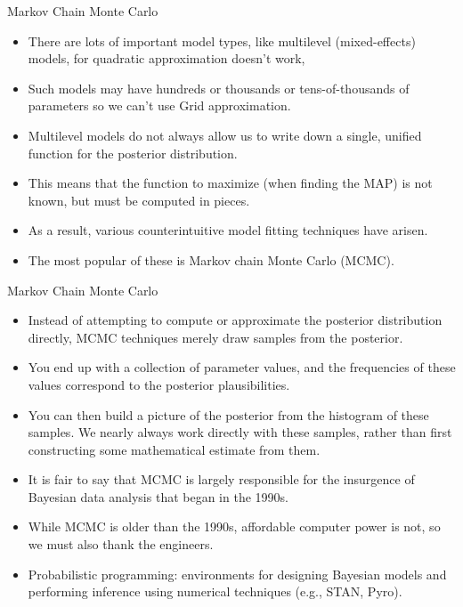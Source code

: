 \documentclass[handout]{beamer}
\begin{document}
\begin{frame}{Markov Chain Monte Carlo}
\scriptsize{

\begin{itemize}
\item There are lots of important model types, like multilevel (mixed-effects) models, for  quadratic approximation doesn't work,
\item Such models may have hundreds or thousands or tens-of-thousands of parameters so we can't use Grid approximation.
\item Multilevel models do not always allow us to write down a single, unified function for the posterior distribution.
\item This means that the function to maximize (when finding the MAP) is not known, but must be computed in pieces. 
\item As a result, various counterintuitive model fitting techniques have arisen. 
\item The most popular of these is Markov chain Monte Carlo (MCMC).
\end{itemize}


} 
\end{frame}


\begin{frame}{Markov Chain Monte Carlo}
\scriptsize{

\begin{itemize}
\item Instead of attempting to compute or approximate the posterior distribution directly, MCMC techniques merely draw samples from the posterior.
\item You end up with a collection of parameter values, and the frequencies of these values correspond to the posterior plausibilities.
\item You can then build a picture of the posterior from the histogram of these samples.
We nearly always work directly with these samples, rather than first constructing some
mathematical estimate from them.
\item It is fair to say that MCMC is largely responsible for the insurgence of Bayesian data analysis that began in the 1990s. 
\item While MCMC is older than the 1990s, affordable computer power is not, so we must also thank the engineers.
\item Probabilistic programming: environments for designing Bayesian models and performing inference using numerical techniques (e.g., STAN, Pyro).
\end{itemize}


} 
\end{frame}
\end{document}
